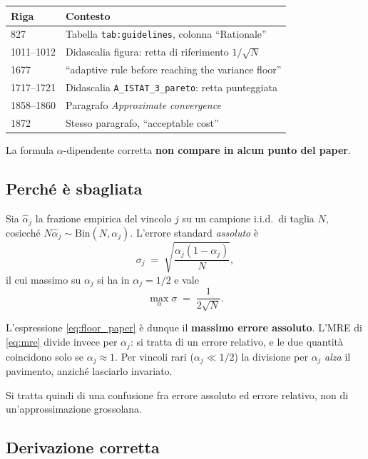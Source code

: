 \documentclass[11pt,a4paper]{article}
\begin{document}
\begin{center}
\begin{tabular}{ll}
\toprule
Riga & Contesto \\
\midrule
827        & Tabella \texttt{tab:guidelines}, colonna ``Rationale'' \\
1011--1012 & Didascalia figura: retta di riferimento $1/\sqrt{N}$ \\
1677       & ``adaptive rule before reaching the variance floor'' \\
1717--1721 & Didascalia \texttt{A\_ISTAT\_3\_pareto}: retta punteggiata \\
1858--1860 & Paragrafo \emph{Approximate convergence} \\
1872       & Stesso paragrafo, ``acceptable cost'' \\
\bottomrule
\end{tabular}
\end{center}

La formula $\alpha$-dipendente corretta \textbf{non compare in alcun
punto del paper}.

\subsection{Perché è sbagliata}

Sia $\hat\alpha_j$ la frazione empirica del vincolo $j$ su un campione
i.i.d.\ di taglia $N$, cosicché $N\hat\alpha_j\sim
\mathrm{Bin}(N,\alpha_j)$. L'errore standard \emph{assoluto} è
\begin{equation}
  \sigma_j \;=\; \sqrt{\frac{\alpha_j(1-\alpha_j)}{N}} ,
\end{equation}
il cui massimo su $\alpha_j$ si ha in $\alpha_j=1/2$ e vale
\begin{equation}
  \max_{\alpha}\sigma \;=\; \frac{1}{2\sqrt{N}} .
\end{equation}

L'espressione \eqref{eq:floor_paper} è dunque il \textbf{massimo errore
assoluto}. L'MRE di \eqref{eq:mre} divide invece per $\alpha_j$: si
tratta di un errore relativo, e le due quantità coincidono solo se
$\alpha_j\approx 1$. Per vincoli rari ($\alpha_j\ll 1/2$) la divisione
per $\alpha_j$ \emph{alza} il pavimento, anziché lasciarlo invariato.

Si tratta quindi di una confusione fra errore assoluto ed errore
relativo, non di un'approssimazione grossolana.

\subsection{Derivazione corretta}
\end{document}

